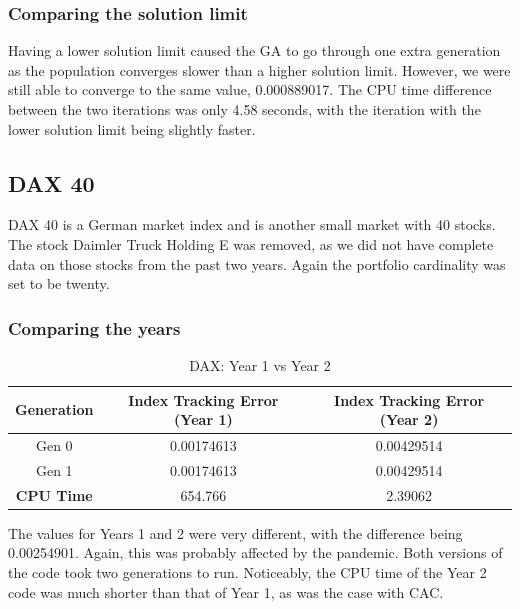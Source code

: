 \documentclass[12pt]{report}
\begin{document}
\subsubsection*{Comparing the solution limit}
\begin{table}[h!]
\centering
{}
\caption{CAC: Solution limit 20 vs Solution limit 10}
\label{table:cacsollimit}
\end{table}

\noindent
Having a lower solution limit caused the GA to go through one extra generation as the population converges slower than a higher solution limit. However, we were still able to converge to the same value, 0.000889017. The CPU time difference between the two iterations was only 4.58 seconds, with the iteration with the lower solution limit being slightly faster.
\subsection{DAX 40}
DAX 40 is a German market index and is another small market with 40 stocks. The stock Daimler Truck Holding E was removed, as we did not have complete data on those stocks from the past two years. Again the portfolio cardinality was set to be twenty.
\subsubsection*{Comparing the years}
\begin{table}[h!]
\centering
\begin{tabular}{| c | c| c|} 
\hline \rowcolor{lightgray}
\textbf{Generation} & \textbf{Index Tracking Error (Year 1)} & \textbf{Index Tracking Error (Year 2)} \\
\hline
Gen 0 & 0.00174613 & 0.00429514\\ \hline
Gen 1 & 0.00174613 & 0.00429514\\ \hline
\textbf{CPU Time} & 654.766 & 2.39062\\
\hline
\end{tabular}
\caption{DAX: Year 1 vs Year 2}
\label{table:daxyears}
\end{table}
\noindent
The values for Years 1 and 2 were very different, with the difference being 0.00254901. Again, this was probably affected by the pandemic. Both versions of the code took two generations to run. Noticeably, the CPU time of the Year 2 code was much shorter than that of Year 1, as was the case with CAC. %
\end{document}
